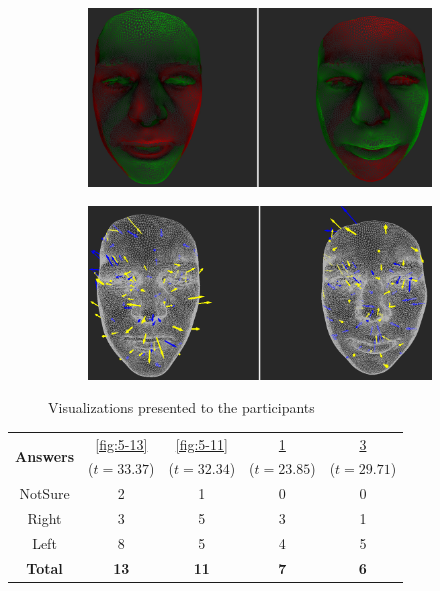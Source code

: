 \begin{figure}[h]
\begin{subfigure}{0.4\textwidth}
\includegraphics[width=\textwidth]{./screenshots/pair12.PNG}
\caption{}
\label{fig:5-12}
\end{subfigure}
\quad
\begin{subfigure}{0.4\textwidth}
\includegraphics[width=\textwidth]{./screenshots/pair14.PNG}
\caption{}
\label{fig:5-14}
\end{subfigure}
\caption{Visualizations presented to the participants}
\end{figure}
\medskip
\begin{center}
\begin{tabular}{| c | c | c | c | c |}
	\hline
\multirow{2}{*}{\bf Answers} & \ref{fig:5-13} & \ref{fig:5-11} & \ref{fig:5-12} & \ref{fig:5-14}\\
	&  (\(t=33.37\)) &  (\(t=32.34\)) &  (\(t=23.85\)) &  (\(t=29.71\))\\ \hline
	NotSure & 2 & 1 & 0 & 0\\ \hline
	Right & 3 & 5 & 3 & 1\\ \hline
	Left & 8 & 5 & 4 & 5\\ \hline
	{\bf Total} & {\bf 13} & {\bf 11} & {\bf 7} & {\bf 6}\\ \hline
\end{tabular}
\end{center}
\clearpage

